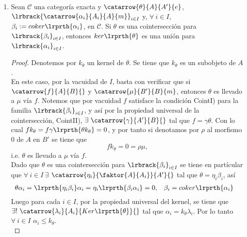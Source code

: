 \documentclass{article}
\begin{document}
\begin{enumerate}[label=\textbf{Ej \arabic*.}]
				\renewcommand{\copyandpaste}{i\in I}
		\item Sean $\mathscr{C}$ una categoría exacta y $\catarrow{\theta}{A}{A'}{e}$, $\lrbrack{\catarrow{\alpha_i}{A_i}{A}{m}}_{i\in I}$  y, $\forall\ i\in I$, $\beta_i:=coker\lrprth{\alpha_i}$, en $\mathscr{C}$. Si $\theta$ es una cointersección para $\lrbrack{\beta_i}_{i\in I}$, entonces $ker\lrprth{\theta}$ es una unión para $\lrbrack{\alpha_i}_{i\in I}$.
		\begin{proof}
			Denotemos por $k_{\theta}$ un kernel de $\theta$. Se tiene que $k_{\theta}$ es un subobjeto de $A$.\\
			 En este caso, por la vacuidad de $I$, basta con verificar que si $\catarrow{f}{A}{B}{}$ y $\catarrow{\mu}{B'}{B}{m}$, entonces $\theta$ es llevado a $\mu$ vía $f$. Notemos que por vacuidad $f$ satisface la condición CointI) para la familia $\lrbrack{\beta_i}_{\copyandpaste}$, y así por la propiedad universal de la cointersección, CointII), $\exists\ \catarrow{\gamma}{A'}{B}{}$ tal que $f=\gamma \theta$. Con lo cual $fk_{\theta}=f\gamma\lrprth{\theta k_{\theta}}=0$, y por tanto si denotamos por $\rho$ al morfismo $0$ de $A$ en $B'$ se tiene que
			\begin{equation*}
				fk_{\theta}=0=\rho\mu,
			\end{equation*}
			i.e. $\theta$ es llevado a $\mu$ vía $f$.\\
			
			 Dado que $\theta$ es una cointersección para $\lrbrack{\beta_i}_{\copyandpaste}$ se tiene en partícular que $\forall\ i\in I\ \exists$ $\catarrow{\eta_i}{\faktor{A}{A_i}}{A'}{}$ tal que $\theta=\eta_i\beta_i$, así
			\begin{align*}
				\theta\alpha_i&=\lrprth{\eta_i\beta_i}\alpha_i=\eta_i\lrprth{\beta_i\alpha_i}=0, && \beta_i=coker\lrprth{\alpha_i}
			\end{align*}
			Luego para cada $i\in I$, por la propiedad universal del kernel, se tiene que $\exists !\ \catarrow{\lambda_i}{A_i}{Ker\lrprth{\theta}}{}$ tal que $\alpha_i=k_{\theta}\lambda_i$. Por lo tanto $\forall\ \copyandpaste$ $\alpha_i\leq k_{\theta}$.\\
			

\end{proof}
\end{enumerate}
\end{document}
